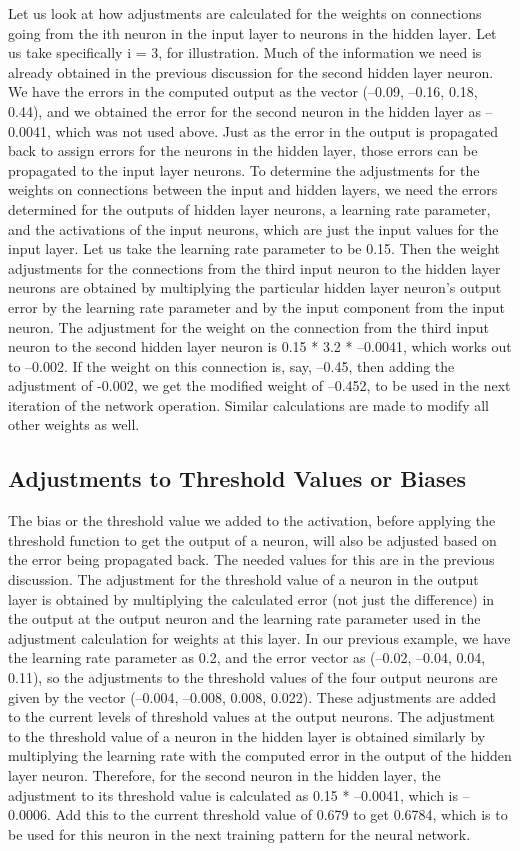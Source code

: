 \documentclass[12pt, right open]{memoir}
\begin{document}
Let us look at how adjustments are calculated for the weights on connections going from the ith neuron in the input layer to neurons in the hidden layer. Let us take specifically i = 3, for illustration. Much of the information we need is already obtained in the previous discussion for the second hidden layer neuron. We have the errors in the computed output as the vector (–0.09, –0.16, 0.18, 0.44), and we obtained the error for the second neuron in the hidden layer as –0.0041, which was not used above. Just as the error in the output is propagated back to assign errors for the neurons in the hidden layer, those errors can be propagated to the input layer neurons.
To determine the adjustments for the weights on connections between the input and hidden layers, we need the errors determined for the outputs of hidden layer neurons, a learning rate parameter, and the activations of the input neurons, which are just the input values for the input layer. Let us take the learning rate parameter to be 0.15. Then the weight adjustments for the connections from the third input neuron to the hidden layer neurons are obtained by multiplying the particular hidden layer neuron’s output error by the learning rate parameter and by the input component from the input neuron. The adjustment for the weight on the connection from the third input neuron to the second hidden layer neuron is 0.15 * 3.2 * –0.0041, which works out to –0.002. If the weight on this connection is, say, –0.45, then adding the adjustment of -0.002, we get the modified
weight of –0.452, to be used in the next iteration of the network operation. Similar calculations are made to modify all other weights as well.

\subsection{Adjustments to Threshold Values or Biases}
The bias or the threshold value we added to the activation, before applying the
threshold function to get the output of a neuron, will also be adjusted based on
the error being propagated back. The needed values for this are in the previous
discussion.
The adjustment for the threshold value of a neuron in the output layer is
obtained by multiplying the calculated error (not just the difference) in the
output at the output neuron and the learning rate parameter used in the
adjustment calculation for weights at this layer. In our previous example, we
have the learning rate parameter as 0.2, and the error vector as (–0.02, –0.04,
0.04, 0.11), so the adjustments to the threshold values of the four output
neurons are given by the vector (–0.004, –0.008, 0.008, 0.022). These
adjustments are added to the current levels of threshold values at the output
neurons.
The adjustment to the threshold value of a neuron in the hidden layer is
obtained similarly by multiplying the learning rate with the computed error in
the output of the hidden layer neuron. Therefore, for the second neuron in the
hidden layer, the adjustment to its threshold value is calculated as 0.15 *
–0.0041, which is –0.0006. Add this to the current threshold value of 0.679 to
get 0.6784, which is to be used for this neuron in the next training pattern for
the neural network.
\end{document}
